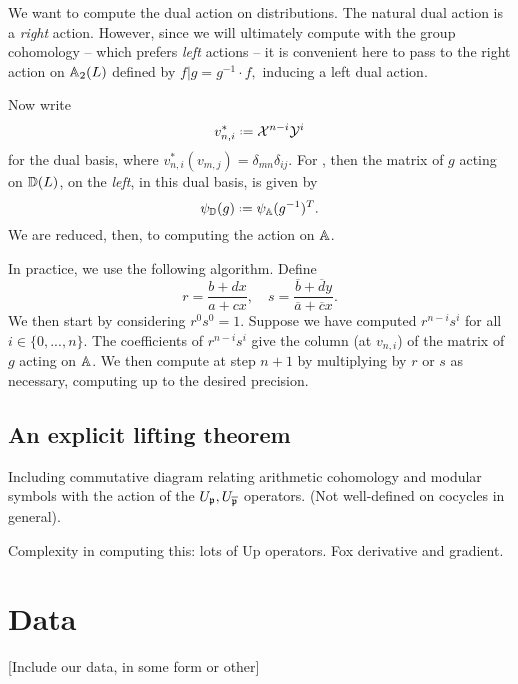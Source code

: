 \documentclass[a4paper,11pt]{article}
\numberwithin{equation}{section}
\begin{document}
We want to compute the dual action on distributions. The natural dual action is a \emph{right} action. However, since we will ultimately compute with the group cohomology -- which prefers \emph{left} actions -- it is convenient here to pass to the right action on $\mathbb{A}_2(L)$ defined by $f|g = g^{-1}\cdot f,$ inducing a left dual action.

Now write
\[
	v_{n,i}^* \defeq \mathcal{X}^{n-i}\mathcal{Y}^i
\]
for the dual basis, where $v_{n,i}^*(v_{m,j}) = \delta_{mn}\delta_{ij}.$ For , then the matrix of $g$ acting on $\mathbb{D}(L)$, on the \emph{left}, in this dual basis, is given by
\[
	\psi_{\D}(g) \defeq \psi_{\A}(g^{-1})^T.
\]
We are reduced, then, to computing the action on $\mathbb{A}$.

In practice, we use the following algorithm. Define
\[
	r = \frac{b+dx}{a+cx}, \hspace{12pt} s = \frac{\overline{b}+\overline{d}y}{\overline{a}+\overline{c}x}.
\]
We then start by considering $r^0s^0 = 1$. Suppose we have computed $r^{n-i}s^i$ for all $i \in \{0,...,n\}.$ The coefficients of $r^{n-i}s^i$ give the column (at $v_{n,i}$) of the matrix of $g$ acting on $\mathbb{A}$. We then compute at step $n+1$ by multiplying by $r$ or $s$ as necessary, computing up to the desired precision.


\subsection{An explicit lifting theorem}
Including commutative diagram relating arithmetic cohomology and modular symbols with the action of the $U_{\mathfrak{p}}, U_{\overline{\mathfrak{p}}}$ operators. (Not well-defined on cocycles in general).


Complexity in computing this: lots of Up operators. Fox derivative and gradient.


\section{Data}
[Include our data, in some form or other]
\end{document}
